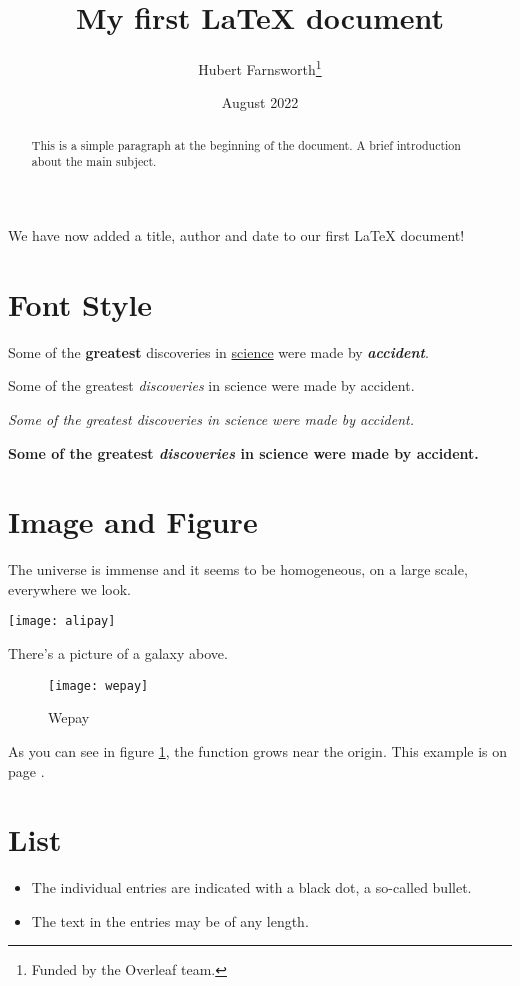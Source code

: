 \documentclass{article}
\title{My first LaTeX document}
\author{Hubert Farnsworth\thanks{Funded by the Overleaf team.}}
\date{August 2022}
\begin{document}
\maketitle
\begin{abstract}
  This is a simple paragraph at the beginning of the 
  document. A brief introduction about the main subject.
\end{abstract}

We have now added a title, author and date to our first \LaTeX{} document!

\section{Font Style}

Some of the \textbf{greatest}
discoveries in \underline{science} 
were made by \textbf{\textit{accident}}.

Some of the greatest \emph{discoveries} in science 
were made by accident.

\textit{Some of the greatest \emph{discoveries} 
in science were made by accident.}

\textbf{Some of the greatest \emph{discoveries} 
in science were made by accident.}

\section{Image and Figure}

The universe is immense and it seems to be homogeneous, 
on a large scale, everywhere we look.

\texttt{[image: alipay]}  
 
There's a picture of a galaxy above.

\begin{figure}[h]
  \centering
  \texttt{[image: wepay]}
  \caption{Wepay}
  \label{fig:wepay}
\end{figure}

As you can see in figure \ref{fig:wepay}, the function grows near the origin. This example is on page \pageref{fig:wepay}.

\section{List}

\begin{itemize}
  \item The individual entries are indicated with a black dot, a so-called bullet.
  \item The text in the entries may be of any length.
\end{itemize}
\end{document}

